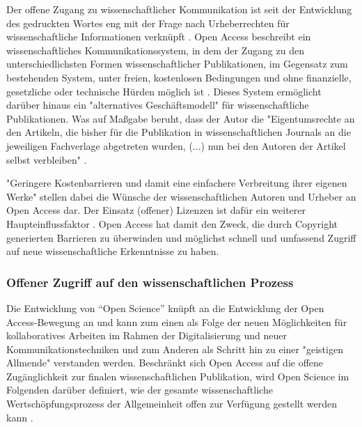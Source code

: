 Der offene Zugang zu wissenschaftlicher Kommunikation ist seit der Entwicklung des gedruckten Wortes eng mit der Frage nach Urheberrechten für wissenschaftliche Informationen verknüpft \cite{Case_2000}. Open Access beschreibt ein wissenschaftliches Kommunikationssystem, in dem der Zugang zu den unterschiedlichsten Formen wissenschaftlicher Publikationen, im Gegensatz zum bestehenden System, unter freien, kostenlosen Bedingungen und ohne finanzielle, gesetzliche oder technische Hürden möglich ist \cite{WD_bundestag_2009}. Dieses System ermöglicht darüber hinaus ein "alternatives Geschäftsmodell"\cite{lewis_2012_inevitability} für wissenschaftliche Publikationen. Was auf Maßgabe beruht, dass der Autor die "Eigentumsrechte an den Artikeln, die bisher für die Publikation in wissenschaftlichen Journals an die jeweiligen Fachverlage abgetreten wurden, (...) nun bei den Autoren der Artikel selbst verbleiben" \cite{Hess_2006}.

"Geringere Kostenbarrieren und damit eine einfachere Verbreitung ihrer eigenen Werke" \cite{WD_bundestag_2009} stellen dabei die Wünsche der wissenschaftlichen Autoren und Urheber an Open Access dar. Der Einsatz (offener) Lizenzen ist dafür ein weiterer Haupteinflussfaktor \cite{cite:16}. Open Access hat damit den Zweck, die durch Copyright generierten Barrieren zu überwinden und möglichst schnell und umfassend Zugriff auf neue wissenschaftliche Erkenntnisse zu haben.

\subsubsection{Offener Zugriff auf den wissenschaftlichen Prozess}

Die Entwicklung von “Open Science” knüpft an die Entwicklung der Open Access-Bewegung an und kann zum einen als Folge der neuen Möglichkeiten für kollaboratives Arbeiten im Rahmen der Digitalisierung und neuer Kommunikationstechniken und zum Anderen als Schritt hin zu einer "geistigen Allmende" \cite{naeder_2010_open} verstanden werden. Beschränkt sich Open Access auf die offene Zugänglichkeit zur finalen wissenschaftlichen Publikation, wird Open Science im Folgenden darüber definiert, wie der gesamte wissenschaftliche Wertschöpfungsprozess der Allgemeinheit offen zur Verfügung gestellt werden kann \cite{grand_2012_open}.

